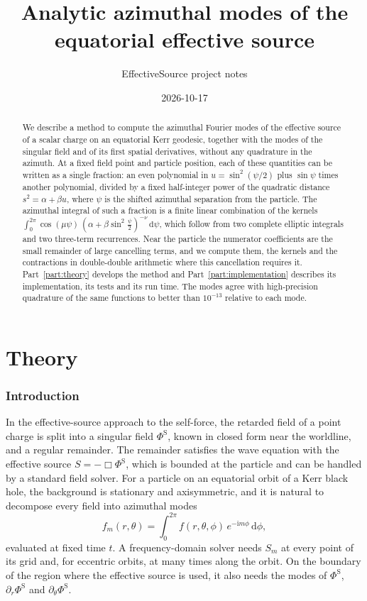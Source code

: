 \documentclass[11pt]{article}
\title{Analytic azimuthal modes of the equatorial effective source}
\author{EffectiveSource project notes}
\date{2026-10-17}
\newcommand{\ii}{\mathrm{i}}
\newcommand{\dd}{\mathrm{d}}
\newcommand{\PhiS}{\Phi^{\mathrm{S}}}
\begin{document}
\maketitle

\begin{abstract}
We describe a method to compute the azimuthal Fourier modes of the effective
source of a scalar charge on an equatorial Kerr geodesic, together with the
modes of the singular field and of its first spatial derivatives, without any
quadrature in the azimuth. At a fixed field point and particle position, each of
these quantities can be written as a single fraction: an even polynomial in
$u=\sin^2(\psi/2)$ plus $\sin\psi$ times another polynomial, divided by a fixed
half-integer power of the quadratic distance $s^2=\alpha+\beta u$, where $\psi$
is the shifted azimuthal separation from the particle. The azimuthal integral of
such a fraction is a finite linear combination of the kernels
$\int_0^{2\pi}\cos(\mu\psi)\,(\alpha+\beta\sin^2\tfrac{\psi}{2})^{-\nu}\,\dd\psi$,
which follow from two complete elliptic integrals and two three-term
recurrences. Near the particle the numerator coefficients are the small
remainder of large cancelling terms, and we compute them, the kernels and the
contractions in double-double arithmetic where this cancellation requires it.
Part~\ref{part:theory} develops the method and Part~\ref{part:implementation}
describes its implementation, its tests and its run time. The modes agree with
high-precision quadrature of the same functions to better than $10^{-13}$
relative to each mode.
\end{abstract}

\tableofcontents

\part{Theory}
\label{part:theory}

\section{Introduction}
\label{sec:intro}

In the effective-source approach to the self-force, the retarded field of a
point charge is split into a singular field $\PhiS$, known in closed form near
the worldline, and a regular remainder. The remainder satisfies the wave
equation with the effective source $S=-\Box\PhiS$, which is bounded at the
particle and can be handled by a standard field solver. For a particle on an
equatorial orbit of a Kerr black hole, the background is stationary and
axisymmetric, and it is natural to decompose every field into azimuthal modes
\begin{equation}
  \label{eq:mode}
  f_m(r,\theta) = \int_0^{2\pi} f(r,\theta,\phi)\, e^{-\ii m\phi}\,\dd\phi ,
\end{equation}
evaluated at fixed time $t$. A frequency-domain solver needs $S_m$ at every
point of its grid and, for eccentric orbits, at many times along the orbit. On
the boundary of the region where the effective source is used, it also needs
the modes of $\PhiS$, $\partial_r\PhiS$ and $\partial_\theta\PhiS$.
\end{document}
